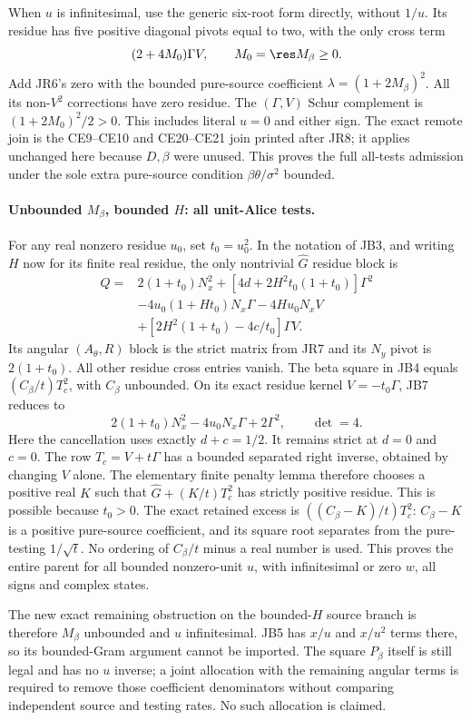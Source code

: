 When $u$ is infinitesimal, use the generic six-root form directly,
without $1/u$. Its residue has five positive diagonal pivots equal to
two, with the only cross term
\[
 (2+4M_0)\Gamma V,\qquad M_0=\res M_\beta\ge0.
\]
Add JR6's zero with the bounded pure-source coefficient
$\lambda=(1+2M_\beta)^2$. All its non-$V^2$ corrections have zero
residue. The $(\Gamma,V)$ Schur complement is
$(1+2M_0)^2/2>0$. This includes literal $u=0$ and either sign.
The exact remote join is the CE9--CE10 and CE20--CE21 join printed
after JR8; it applies unchanged here because $D,\beta$ were unused.
This proves the full all-tests admission under the sole extra
pure-source condition $\beta\theta/\sigma^2$ bounded.

\paragraph{Unbounded $M_\beta$, bounded $H$: all unit-Alice tests.}
For any real nonzero residue $u_0$, set $t_0=u_0^2$. In the notation
of JB3, and writing $H$ now for its finite real residue, the only
nontrivial $\widehat G$ residue block is
\begin{align*}
 Q={}&2(1+t_0)N_x^2+[4d+2H^2t_0(1+t_0)]\Gamma^2\\
 &-4u_0(1+Ht_0)N_x\Gamma-4Hu_0N_xV\\
 &+[2H^2(1+t_0)-4c/t_0]\Gamma V.
\tag{JB7}
\end{align*}
Its angular $(A_\theta,R)$ block is the strict matrix from JR7 and
its $N_y$ pivot is $2(1+t_0)$. All other residue cross entries vanish.
The beta square in JB4 equals $(C_\beta/t)T_c^2$, with
$C_\beta$ unbounded. On its exact residue kernel $V=-t_0\Gamma$,
JB7 reduces to
\[
 2(1+t_0)N_x^2-4u_0N_x\Gamma+2\Gamma^2,
 \qquad \det=4.
\tag{JB8}
\]
Here the cancellation uses exactly $d+c=1/2$. It remains strict at
$d=0$ and $c=0$. The row $T_c=V+t\Gamma$ has a bounded separated
right inverse, obtained by changing $V$ alone. The elementary finite
penalty lemma therefore chooses a positive real $K$ such that
$\widehat G+(K/t)T_c^2$ has strictly positive residue. This is possible
because $t_0>0$. The exact retained excess is
$((C_\beta-K)/t)T_c^2$: $C_\beta-K$ is a positive pure-source
coefficient, and its square root separates from the pure-testing
$1/\sqrt t$. No ordering of $C_\beta/t$ minus a real number is used.
This proves the entire
parent for all bounded nonzero-unit $u$, with infinitesimal or zero
$w$, all signs and complex states.

The new exact remaining obstruction on the bounded-$H$ source branch
is therefore $M_\beta$ unbounded and $u$ infinitesimal. JB5 has
$x/u$ and $x/u^2$ terms there, so its bounded-Gram argument cannot be
imported. The square $P_\beta$ itself is still legal and has no
$u$ inverse; a joint allocation with the remaining angular terms is
required to remove those coefficient denominators without comparing
independent source and testing rates. No such allocation is claimed.

